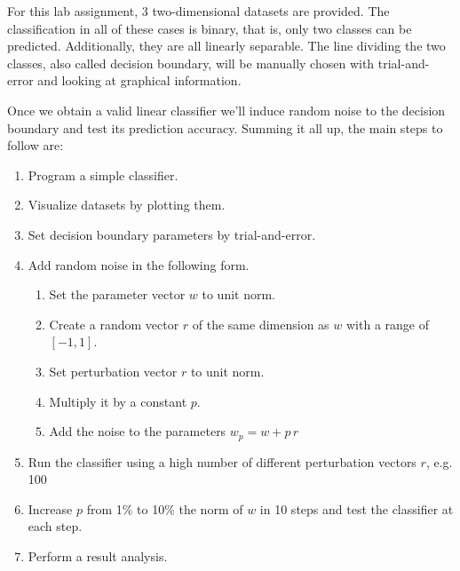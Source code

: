 For this lab assignment, 3 two-dimensional datasets are provided. The classification in all of these cases is binary, that is, only two classes can be predicted. Additionally, they are all linearly separable. The line dividing the two classes, also called decision boundary, will be manually chosen with trial-and-error and looking at graphical information.

Once we obtain a valid linear classifier we'll induce random noise to the decision boundary and test its prediction accuracy. Summing it all up, the main steps to follow are:
\begin{enumerate}
	\item Program a simple classifier.
	\item Visualize datasets by plotting them.
	\item Set decision boundary parameters by trial-and-error.
	\item Add random noise in the following form.
	\begin{enumerate}
		\item Set the parameter vector $w$ to unit norm.
		\item Create a random vector $r$ of the same dimension as $w$ with a range of $[-1, 1]$.
		\item Set perturbation vector $r$ to unit norm.
		\item Multiply it by a constant $p$.
		\item Add the noise to the parameters $w_p = w + p \, r$
	\end{enumerate}
	\item Run the classifier using a high number of different perturbation vectors $r$, e.g. 100
	\item Increase $p$ from 1\% to 10\% the norm of $w$ in 10 steps and test the classifier at each step.
	\item Perform a result analysis.
\end{enumerate}
